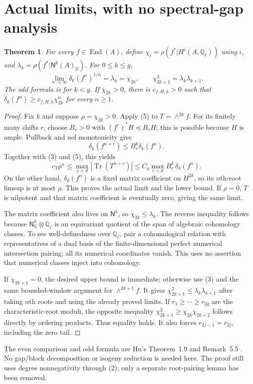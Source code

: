 \documentclass[11pt]{article}
\newtheorem{theorem}{Theorem}
\newcommand{\End}{\operatorname{End}}\newcommand{\Tr}{\operatorname{Tr}}
\newcommand{\Q}{\mathbb Q}\newcommand{\R}{\mathbb R}\newcommand{\C}{\mathbb C}
\newcommand{\N}{\mathsf N}
\begin{document}
\section{Actual limits, with no spectral-gap analysis}
\begin{theorem}\label{comparison}
For every $f\in\End(A)$, define
$\chi_i=\rho(f^*|H^i(A,\Q_\ell))$ using $\iota$, and
$\lambda_k=\rho(f^*|\N^k(A)_\R)$. For $0\le k\le g$,
\[
 \lim_{n\to\infty}\delta_k(f^n)^{1/n}=\lambda_k=\chi_{2k},\qquad
 \chi_{2k+1}^2=\lambda_k\lambda_{k+1}.
 \tag{6}
\]
The odd formula is for $k<g$.
If $\chi_{2k}>0$, there is $c_{f,H,k}>0$ such that
$\delta_k(f^n)\ge c_{f,H,k}\chi_{2k}^n$ for every $n\ge1$.
\end{theorem}
\begin{proof}
Fix $k$ and suppose $\rho=\chi_{2k}>0$.
Apply (5) to $T=\wedge^{2k}f$. For its finitely many shifts $r$, choose
$B_r>0$ with $(f^r)^*H\preceq B_rH$; this is possible because $H$
is ample. Pullback and nef monotonicity give
\[
 \delta_k(f^{n+r})\le B_r^k\delta_k(f^n).
\]
Together with (3) and (5), this yields
\[
 c_T\rho^n\le\max_{r<d}|\Tr(T^{n+r})|
 \le C_g\max_{r<d}B_r^k\,\delta_k(f^n).
 \tag{7}
\]
On the other hand, $\delta_k(f^n)$ is a fixed matrix coefficient on
$H^{2k}$, so its $n$th-root limsup is at most $\rho$. This proves
the actual limit and the lower bound. If $\rho=0$, $T$ is nilpotent
and that matrix coefficient is eventually zero, giving the same limit.

The matrix coefficient also lives on $\N^k$, so $\chi_{2k}\le\lambda_k$.
The reverse inequality follows because $\N^k_\Q\otimes\Q_\ell$ is an
equivariant quotient of the span of algebraic cohomology classes.
To see well-definedness over $\Q_\ell$, pair a cohomological relation
with representatives of a dual basis of the finite-dimensional perfect
numerical intersection pairing; all its numerical coordinates vanish.
This uses no assertion that numerical classes inject into cohomology.

If $\chi_{2k+1}=0$, the desired upper bound is immediate; otherwise
use (3) and the same bounded-window argument for $\wedge^{2k+1}f$.
It gives $\chi_{2k+1}^2\le\lambda_k\lambda_{k+1}$ after taking $n$th
roots and using the already proved limits. If
$r_1\ge\cdots\ge r_{2g}$ are the characteristic-root moduli, the
opposite inequality
$\chi_{2k+1}^2\ge\chi_{2k}\chi_{2k+2}$ follows directly by ordering
products. Thus equality holds. It also forces
$r_{2j-1}=r_{2j}$, including the zero tail.
\end{proof}
The even comparison and odd formula are Hu's Theorem~1.9 and
Remark~5.5 \cite{Hu}. No gap/block decomposition or isogeny reduction
is needed here. The proof still uses degree nonnegativity through (2);
only a separate root-pairing lemma has been removed.
\end{document}
